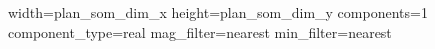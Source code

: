 width={{plan_som_dim_x}}
height={{plan_som_dim_y}}
components=1
component_type=real
mag_filter=nearest
min_filter=nearest
